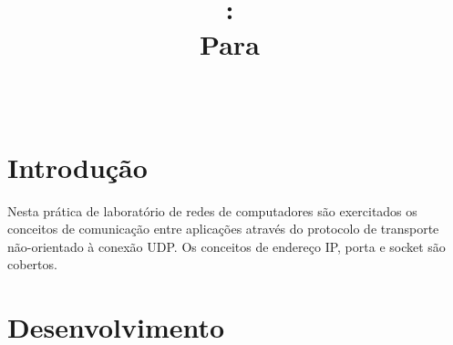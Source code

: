 \documentclass{article}
\title{
\vspace{2in}
\textmd{\textbf{\hmwkClass:\ \hmwkTitle}}\\
\normalsize\vspace{0.1in}\small{Para\ \hmwkDueDate}\\
\vspace{0.1in}\large{\textit{\hmwkClassInstructor\ \hmwkClassTime}}
\vspace{3in}
}
\author{\textbf{\hmwkAuthorName}}
\date{} %
\begin{document}
\maketitle



\newpage

\section{Introdução}

Nesta prática de laboratório de redes de computadores são exercitados os conceitos de comunicação entre aplicações através do protocolo de transporte não-orientado à conexão UDP. Os conceitos de endereço IP, porta e socket são cobertos.

\section{Desenvolvimento}

\end{document}

